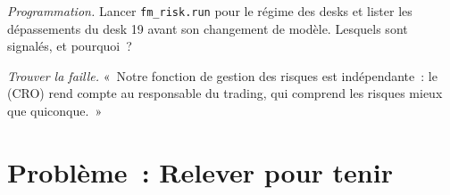 \begin{exercise}[$\star\star\star$]\label{exo:fm:the-risk-management-function:7}
\emph{Programmation.} Lancer \texttt{fm\_risk.run} pour le régime des desks et lister les dépassements du desk 19 avant son changement de modèle. Lesquels sont signalés, et pourquoi~?
\end{exercise}

\begin{exercise}[$\star\star\star$]\label{exo:fm:the-risk-management-function:8}
\emph{Trouver la faille.} «~Notre fonction de gestion des risques est indépendante~: le  (CRO) rend compte au responsable du trading, qui comprend les risques mieux
que quiconque.~»
\end{exercise}

\section{Problème~: Relever pour tenir}

